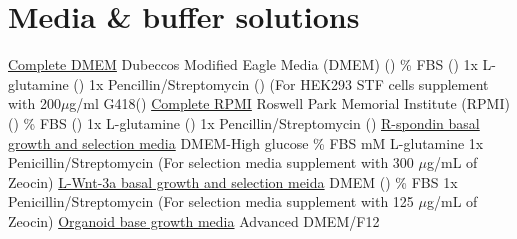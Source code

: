 \documentclass[a4paper]{report}
\begin{document}
\section{Media \& buffer solutions}
\begin{indentlist}
\newline\underline{Complete DMEM}
\vspace{2mm}\newline Dubeccos Modified Eagle Media (DMEM) ()
\% FBS ()
\newline 1x L-glutamine ()
\newline 1x Pencillin/Streptomycin ()
\newline (For HEK293 STF cells supplement with 200$\mu$g/ml G418()
\vspace{2mm}\newline\underline{Complete RPMI}
\vspace{2mm}\newline Roswell Park Memorial Institute (RPMI) ()
\% FBS ()
\newline 1x L-glutamine ()
\newline 1x Pencillin/Streptomycin ()
\vspace{2mm}\newline\underline{R-spondin basal growth and selection media}
\vspace{2mm}\newline DMEM-High glucose 
\% FBS
 mM L-glutamine
\newline 1x Penicillin/Streptomycin
\newline(For selection media supplement with 300 $\mu$g/mL of Zeocin)
\vspace{2mm}\newline\underline{L-Wnt-3a basal growth and selection meida}
\vspace{2mm}\newline DMEM ()
\% FBS
\newline 1x Penicillin/Streptomycin
\newline (For selection media supplement with 125 $\mu$g/mL of Zeocin)
\vspace{2mm}\newline\underline{Organoid base growth media}
\vspace{2mm}\newline Advanced DMEM/F12 

\end{indentlist}
\end{document}
